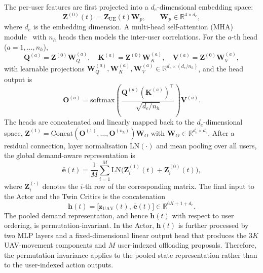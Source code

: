\documentclass[journal]{IEEEtran}
\begin{document}
The per-user features are first projected into a $d_e$-dimensional embedding
space:
\begin{equation}\label{eq:proj}
\bm{Z}^{(0)}(t)=\bm{Z}_{\mathrm{UE}}(t)\bm{W}_p,\qquad
\bm{W}_p\in\mathbb{R}^{4\times d_e},
\end{equation}
where $d_e$ is the embedding dimension. A multi-head self-attention (MHA)
module~\cite{vaswani2017attention} with $n_h$ heads then models the inter-user
correlations. For the
$a$-th head ($a=1,\ldots,n_h$),
\begin{equation}
\bm Q^{(a)}=\bm Z^{(0)}\bm W^{(a)}_Q,\quad
\bm K^{(a)}=\bm Z^{(0)}\bm W^{(a)}_K,\quad
\bm V^{(a)}=\bm Z^{(0)}\bm W^{(a)}_V,
\end{equation}
with learnable projections
$\bm W^{(a)}_Q,\bm W^{(a)}_K,\bm W^{(a)}_V\in\mathbb{R}^{d_e\times(d_e/n_h)}$,
and the head output is
\begin{equation}
\bm O^{(a)}=\mathrm{softmax}\!\left(\frac{\bm Q^{(a)}(\bm K^{(a)})^{\top}}
{\sqrt{d_e/n_h}}\right)\bm V^{(a)}.
\end{equation}
The heads are concatenated and linearly mapped back to the $d_e$-dimensional
space, $\bm Z^{(1)}=\mathrm{Concat}(\bm O^{(1)},\ldots,\bm O^{(n_h)})\bm W_O$
with $\bm W_O\in\mathbb{R}^{d_e\times d_e}$. After a residual connection, layer
normalisation $\mathrm{LN}(\cdot)$ and mean pooling over all users, the global
demand-aware representation is
\begin{equation}
\bar{\bm e}(t)=\frac{1}{M}\sum_{i=1}^{M}
\mathrm{LN}\!\big(\bm Z^{(1)}_{i}(t)+\bm Z^{(0)}_{i}(t)\big),
\end{equation}
where $\bm Z^{(\cdot)}_{i}$ denotes the $i$-th row of the corresponding matrix.
The final input to the Actor and the Twin Critics is the concatenation
\begin{equation}\label{eq:concat}
\bm{h}(t)=\bigl[\bm{z}_{\mathrm{UAV}}(t),\,\bar{\bm{e}}(t)\bigr]
\in\mathbb{R}^{6K+1+d_e}.
\end{equation}
The pooled demand representation, and hence $\bm h(t)$ with respect to user
ordering, is permutation-invariant. In the Actor, $\bm h(t)$ is further
processed by two MLP layers and a fixed-dimensional linear output head that
produces the $3K$ UAV-movement components and $M$ user-indexed offloading
proposals. Therefore, the permutation invariance applies to the pooled
state representation rather than to the user-indexed action outputs.
\end{document}
